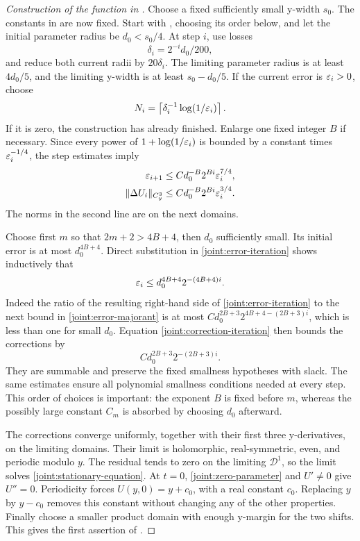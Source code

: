 \begin{proof}[Construction of the function in ]
Choose a fixed sufficiently small y-width \(s_0\). The constants in
 are now fixed. Start with
, choosing its order below, and let
the initial parameter radius be \(d_0<s_0/4\). At step \(i\), use losses
\[
 \delta_i=2^{-i}d_0/200,
\]
and reduce both current radii by \(20\delta_i\). The limiting parameter
radius is at least \(4d_0/5\), and the limiting y-width is at least
\(s_0-d_0/5\). If the current error is \(\varepsilon_i>0\), choose
\[
 N_i=\left\lceil\delta_i^{-1}\log(1/\varepsilon_i)\right\rceil.
\]
If it is zero, the construction has already finished. Enlarge one fixed
integer \(B\) if necessary. Since every power of
\(1+\log(1/\varepsilon_i)\) is bounded by a constant times \(\varepsilon_i^{-1/4}\),
the step estimates imply
\begin{align}
 \varepsilon_{i+1}&\le C d_0^{-B}2^{Bi}\varepsilon_i^{7/4},
 \label{joint:error-iteration}\\
 \|\Delta U_i\|_{C_y^3}
     &\le C d_0^{-B}2^{Bi}\varepsilon_i^{3/4}.
 \label{joint:correction-iteration}
\end{align}
The norms in the second line are on the next domains.

Choose first \(m\) so that \(2m+2>4B+4\), then \(d_0\) sufficiently
small. Its initial error is at most \(d_0^{4B+4}\). Direct substitution
in \eqref{joint:error-iteration} shows inductively that
\begin{equation}
 \varepsilon_i\le d_0^{4B+4}2^{-(4B+4)i}.
 \label{joint:error-majorant}
\end{equation}
Indeed the ratio of the resulting right-hand side of
\eqref{joint:error-iteration} to the next bound in
\eqref{joint:error-majorant} is at most
\(C d_0^{2B+3}2^{4B+4-(2B+3)i}\), which is less than one for small
\(d_0\). Equation \eqref{joint:correction-iteration} then bounds the
corrections by
\[
 C d_0^{2B+3}2^{-(2B+3)i}.
\]
They are summable and preserve the fixed smallness hypotheses with
slack. The same estimates ensure all polynomial smallness conditions
needed at every step. This order of choices is important: the exponent
\(B\) is fixed before \(m\), whereas the possibly large constant
\(C_m\) is absorbed by choosing \(d_0\) afterward.

The corrections converge uniformly, together with their first three
y-derivatives, on the limiting domains. Their limit is holomorphic,
real-symmetric, even, and periodic modulo \(y\). The residual tends to
zero on the limiting \(\mathcal D^1\), so the limit solves
\eqref{joint:stationary-equation}. At \(t=0\),
\eqref{joint:zero-parameter} and \(U'\ne0\) give \(U''=0\).
Periodicity forces \(U(y,0)=y+c_0\), with a real constant \(c_0\).
Replacing \(y\) by \(y-c_0\) removes this constant without changing
any of the other properties. Finally choose a smaller product domain
with enough y-margin for the two shifts. This gives the first assertion
of .
\end{proof}

